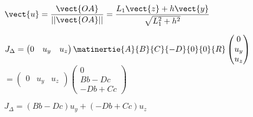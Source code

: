 \begin{multicols}{2}
\ifprof \begin{corrige}
$\vect{u}=\dfrac{\vect{OA}}{||\vect{OA}||}=\dfrac{L_1\vect{z}+h\vect{y}}{\sqrt{L_1^2+h^2}}$

$J_{\Delta}=\begin{pmatrix} 0 & u_y &  u_z \end{pmatrix} \matinertie{A}{B}{C}{-D}{0}{0}{R}
\begin{pmatrix} 0 \\ u_y \\  u_z \end{pmatrix}$
$=\begin{pmatrix} 0 & u_y &  u_z \end{pmatrix} 
\begin{pmatrix} 0 \\ Bb-Dc \\  -Db +Cc \end{pmatrix}$

$J_{\Delta}= \left( Bb-Dc\right)u_y + \left( -Db +Cc\right)u_z$

\end{corrige}\else\fi



\ifprof
\else
\end{multicols}
\fi
%
%
%
%
%
%
%


%